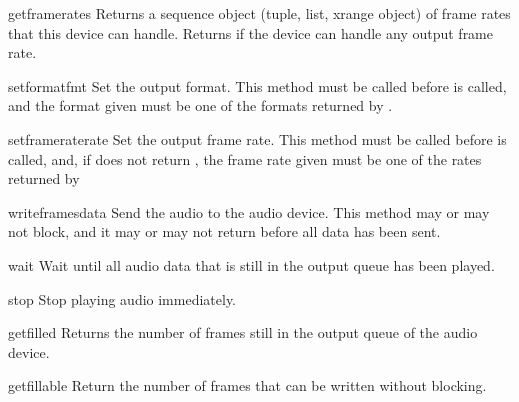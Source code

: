 \begin{funcdesc}{getframerates}{}
Returns a sequence object (tuple, list, xrange object) of frame rates
that this device can handle.  Returns  if the device can
handle any output frame rate.
\end{funcdesc}

\begin{funcdesc}{setformat}{fmt}
Set the output format.  This method must be called before
 is called, and the format given must be one of the
formats returned by .
\end{funcdesc}

\begin{funcdesc}{setframerate}{rate}
Set the output frame rate.  This method must be called before
 is called, and, if  does not return
, the frame rate given must be one of the rates returned by
\end{funcdesc}

\begin{funcdesc}{writeframes}{data}
Send the audio  to the audio device.  This method may or may
not block, and it may or may not return before all data has been sent.
\end{funcdesc}

\begin{funcdesc}{wait}{}
Wait until all audio data that is still in the output queue has been
played.
\end{funcdesc}

\begin{funcdesc}{stop}{}
Stop playing audio immediately.
\end{funcdesc}

\begin{funcdesc}{getfilled}{}
Returns the number of frames still in the output queue of the audio
device.
\end{funcdesc}

\begin{funcdesc}{getfillable}{}
Return the number of frames that can be written without
 blocking.
\end{funcdesc}
